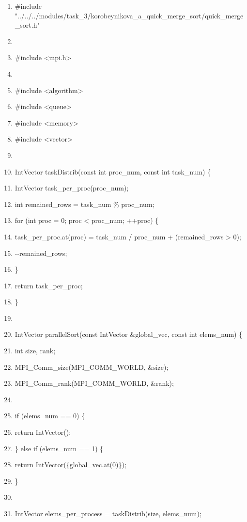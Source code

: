 \documentclass[]{article}
\begin{document}
\begin{enumerate}
\def\labelenumi{\arabic{enumi}.}
\setcounter{enumi}{1}
\item
  \#include
  "../../../modules/task\_3/korobeynikova\_a\_quick\_merge\_sort/quick\_merge\_sort.h"
\item
\item
  \#include \textless{}mpi.h\textgreater{}
\item
\item
  \#include \textless{}algorithm\textgreater{}
\item
  \#include \textless{}queue\textgreater{}
\item
  \#include \textless{}memory\textgreater{}
\item
  \#include \textless{}vector\textgreater{}
\item
\item
  IntVector taskDistrib(const int proc\_num, const int task\_num) \{
\item
  IntVector task\_per\_proc(proc\_num);
\item
  int remained\_rows = task\_num \% proc\_num;
\item
  for (int proc = 0; proc \textless{} proc\_num; ++proc) \{
\item
  task\_per\_proc.at(proc) = task\_num / proc\_num + (remained\_rows
  \textgreater{} 0);
\item
  -\/-remained\_rows;
\item
  \}
\item
  return task\_per\_proc;
\item
  \}
\item
\item
  IntVector parallelSort(const IntVector \&global\_vec, const int
  elems\_num) \{
\item
  int size, rank;
\item
  MPI\_Comm\_size(MPI\_COMM\_WORLD, \&size);
\item
  MPI\_Comm\_rank(MPI\_COMM\_WORLD, \&rank);
\item
\item
  if (elems\_num == 0) \{
\item
  return IntVector();
\item
  \} else if (elems\_num == 1) \{
\item
  return IntVector(\{global\_vec.at(0)\});
\item
  \}
\item
\item
  IntVector elems\_per\_process = taskDistrib(size, elems\_num);

\end{enumerate}
\end{document}
